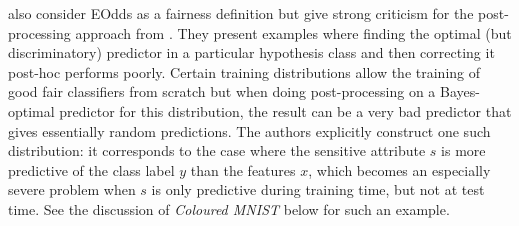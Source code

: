 \citet{woodworth2017learning} also consider \ac{EOdds} as a fairness definition
but give strong criticism for the post-processing approach from \citet{hardt2016equality}.
They present examples where finding the optimal (but discriminatory) predictor in a particular hypothesis class
and then correcting it post-hoc performs poorly.
Certain training distributions allow the training of good fair classifiers from scratch
but when doing post-processing on a Bayes-optimal predictor for this distribution,
the result can be a very bad predictor that gives essentially random predictions.
The authors explicitly construct one such distribution:
it corresponds to the case where the sensitive attribute \(s\) is more predictive of the class label \(y\)
than the features \(x\),
which becomes an especially severe problem when \(s\) is only predictive during training time, but not at test time.
See the discussion of \emph{Coloured MNIST} below for such an example.


